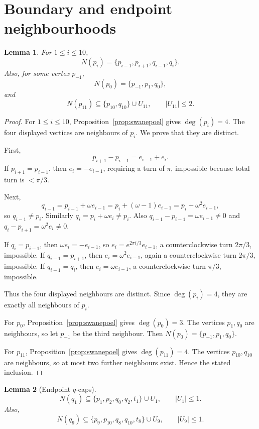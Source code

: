 \documentclass[11pt]{article}
\newtheorem{lemma}{Lemma}
\begin{document}
\section{Boundary and endpoint neighbourhoods}

\begin{lemma}\label{lem:boundary-neighborhoods}
For $1\le i\le 10$,
\[
  N(p_i)=\{p_{i-1},p_{i+1},q_{i-1},q_i\}.
\]
Also, for some vertex $p_{-1}$,
\[
  N(p_0)=\{p_{-1},p_1,q_0\},
\]
and
\[
  N(p_{11})\subseteq \{p_{10},q_{10}\}\cup U_{11},
  \qquad |U_{11}|\le2.
\]
\end{lemma}

\begin{proof}
For $1\le i\le10$, Proposition~\ref{prop:swanepoel} gives $\deg(p_i)=4$. The four displayed vertices are neighbours of $p_i$. We prove that they are distinct.

First,
\[
  p_{i+1}-p_{i-1}=e_{i-1}+e_i.
\]
If $p_{i+1}=p_{i-1}$, then $e_i=-e_{i-1}$, requiring a turn of $\pi$, impossible because total turn is $<\pi/3$.

Next,
\[
  q_{i-1}=p_{i-1}+\omega e_{i-1}=p_i+(\omega-1)e_{i-1}=p_i+\omega^2e_{i-1},
\]
so $q_{i-1}\ne p_i$. Similarly $q_i=p_i+\omega e_i\ne p_i$. Also $q_{i-1}-p_{i-1}=\omega e_{i-1}\ne0$ and $q_i-p_{i+1}=\omega^2e_i\ne0$.

If $q_i=p_{i-1}$, then $\omega e_i=-e_{i-1}$, so $e_i=e^{2\pi i/3}e_{i-1}$, a counterclockwise turn $2\pi/3$, impossible. If $q_{i-1}=p_{i+1}$, then $e_i=\omega^2e_{i-1}$, again a counterclockwise turn $2\pi/3$, impossible. If $q_{i-1}=q_i$, then $e_i=\omega e_{i-1}$, a counterclockwise turn $\pi/3$, impossible.

Thus the four displayed neighbours are distinct. Since $\deg(p_i)=4$, they are exactly all neighbours of $p_i$.

For $p_0$, Proposition~\ref{prop:swanepoel} gives $\deg(p_0)=3$. The vertices $p_1,q_0$ are neighbours, so let $p_{-1}$ be the third neighbour. Then $N(p_0)=\{p_{-1},p_1,q_0\}$.

For $p_{11}$, Proposition~\ref{prop:swanepoel} gives $\deg(p_{11})=4$. The vertices $p_{10},q_{10}$ are neighbours, so at most two further neighbours exist. Hence the stated inclusion.
\end{proof}

\begin{lemma}[Endpoint $q$-caps]\label{lem:endpoint-q-caps}
\[
  N(q_1)\subseteq \{p_1,p_2,q_0,q_2,t_1\}\cup U_1,
  \qquad |U_1|\le1.
\]
Also,
\[
  N(q_9)\subseteq \{p_9,p_{10},q_8,q_{10},t_8\}\cup U_9,
  \qquad |U_9|\le1.
\]
\end{lemma}
\end{document}
